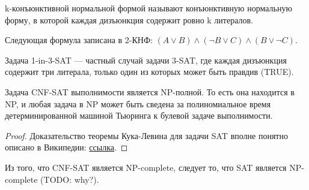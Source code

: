     \begin{Def}[k-КНФ]
        k-конъюнктивной нормальной формой называют конъюнктивную нормальную форму, в которой каждая дизъюнкция содержит ровно k литералов.
    \end{Def}
    \begin{Example}
        Следующая формула записана в 2-КНФ:
        $(A\lor B)\land (\neg B\lor C)\land (B\lor \neg C)$.
    \end{Example}
    \begin{Def}
        Задача 1-in-3-SAT --- частный случай задачи 3-SAT, где каждая дизъюнкция содержит три литерала, только один из которых может быть правдив (TRUE).
    \end{Def}
    \begin{Thm}
        Задача CNF-SAT выполнимости является NP-полной. То есть она находится в NP, и любая задача в NP может быть сведена за полиномиальное время детерминированной машиной Тьюринга к булевой задаче выполнимости.
    \end{Thm}
    \begin{proof}
        Доказательство теоремы Кука-Левина для задачи SAT вполне понятно описано в Википедии: 
        \href{https://en.wikipedia.org/wiki/Cook%E2%80%93Levin_theorem}{ссылка}. 
    \end{proof}
    \begin{Rem}
        Из того, что CNF-SAT является NP-complete, следует то, что SAT является NP-complete (TODO: why?).
    \end{Rem}

    

